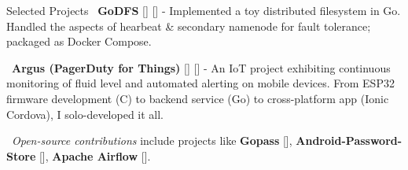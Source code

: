 \documentclass{resume}
\begin{document}
\begin{rSection}{Selected Projects}
  \textbullet\ \textbf{\textsf{GoDFS}} [\textbf{\href{https://rounakdatta.github.io/posts/godfs}{}}] [\textbf{\href{https://github.com/rounakdatta/GoDFS}{}}] - Implemented a  toy distributed filesystem in Go. Handled the aspects of hearbeat \& secondary namenode for fault tolerance; packaged as Docker Compose.

  \textbullet\ \textbf{\textsf{Argus (PagerDuty for Things)}} [\textbf{\href{https://rounakdatta.github.io/posts/pagerduty-for-iot}{}}] [\textbf{\href{https://github.com/rounakdatta?tab=repositories&q=argus}{}}] - An IoT project exhibiting continuous monitoring of fluid level and automated alerting on mobile devices. From ESP32 firmware development (C) to backend service (Go) to cross-platform app (Ionic Cordova), I solo-developed it all.

  \textbullet\ \emph{Open-source contributions} include projects like \textbf{\textsf{Gopass}} [\textbf{\href{https://github.com/gopasspw/gopassbridge}{}}], \textbf{\textsf{Android-Password-Store}} [\textbf{\href{https://github.com/android-password-store/Android-Password-Store}{}}], \textbf{\textsf{Apache Airflow}} [\textbf{\href{https://github.com/apache/airflow}{}}].

\end{rSection}
\end{document}
